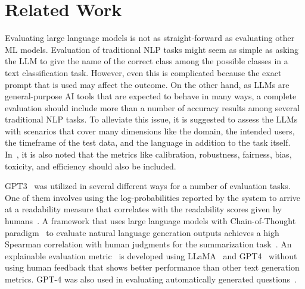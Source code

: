 \section{Related Work}
\label{sec:related-work}


Evaluating large language models is not as straight-forward as evaluating other ML models.
Evaluation of traditional NLP tasks might seem as simple as asking the LLM to give the name of the correct class among the possible classes in a text classification task. However, even this is complicated because the exact prompt that is used may affect the outcome.
On the other hand, as LLMs are general-purpose AI tools that are expected to behave in many ways, a complete evaluation should include more than a number of accuracy results among several traditional NLP tasks.
To alleviate this issue, it is suggested to assess the LLMs with scenarios that cover many dimensions like the domain, the intended users, the timeframe of the test data, and the language in addition to the task itself.
In~\cite{liang2022holistichelm}, it is also noted that the metrics like calibration, robustness, fairness, bias, toxicity, and efficiency should also be included.

GPT3~\cite{brown2020language} was utilized in several different ways for a number of evaluation tasks.
One of them involves using the log-probabilities reported by the system to arrive at a readability measure that correlates with the  readability scores given by humans~\cite{Behre2022TRScoreAN}.
A framework that uses large language models with Chain-of-Thought paradigm~\cite{wei2022chainCoT} to evaluate natural language generation outputs achieves a high Spearman correlation with human judgments for the summarization task~\cite{Liu2023GEvalNE}.
An explainable evaluation metric~\cite{Xu2023INSTRUCTSCORETE} is developed using LLaMA~\cite{touvron2023llama} and GPT4~\cite{openai2021gpt35} without using human feedback that shows better performance than other text generation metrics.
GPT-4 was also used in evaluating automatically generated questions~\cite{moore2023assessing}.
